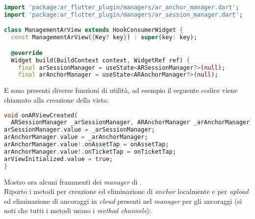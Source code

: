 \begin{lstlisting}[language=dart, label={lst:mobilesyn_managers}, firstnumber=1,caption={mobilesyn \textit{managers}}]
import 'package:ar_flutter_plugin/managers/ar_anchor_manager.dart';
import 'package:ar_flutter_plugin/managers/ar_session_manager.dart';

class ManagementArView extends HookConsumerWidget {
  const ManagementArView({Key? key}) : super(key: key);

  @override
  Widget build(BuildContext context, WidgetRef ref) {
    final arSessionManager = useState<ARSessionManager?>(null);
    final arAnchorManager = useState<ARAnchorManager?>(null);
\end{lstlisting} 

E sono presenti diverse funzioni di utilità, ad esempio il seguente codice viene chiamato alla creazione della vista:

\begin{lstlisting}[language=dart, label={lst:mobilesyn_onARViewCreated}, firstnumber=1,caption={mobilesyn \textit{on ar view created}}]
void onARViewCreated(
  ARSessionManager _arSessionManager, ARAnchorManager _arAnchorManager) {
arSessionManager.value = _arSessionManager;
arAnchorManager.value = _arAnchorManager;
arAnchorManager.value!.onAssetTap = onAssetTap;
arAnchorManager.value!.onTicketTap = onTicketTap;
arViewInitialized.value = true;
}
\end{lstlisting} 

Mostro ora alcuni frammenti dei \textit{manager} di \aplug{}.\\
Riporto i metodi per creazione ed eliminazione di \textit{anchor} localmente e per \textit{upload} ed eliminazione di ancoraggi in \textit{cloud} presenti nel \textit{manager} per gli ancoraggi (si noti che tutti i metodi usano i \textit{method channels}): 

